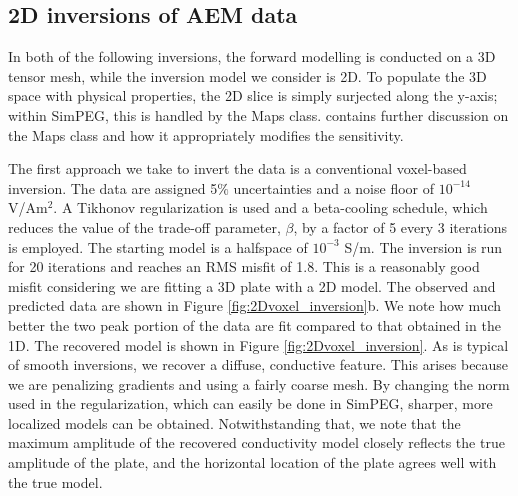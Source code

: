 \documentclass[paper]{geophysics}
\begin{document}
\subsection{2D inversions of AEM data}

In both of the following inversions, the forward modelling is conducted on a 3D tensor mesh, while the inversion model we consider is 2D. To populate the 3D space with physical properties, the 2D slice is simply surjected along the y-axis; within SimPEG, this is handled by the Maps class. \cite{kang2015c} contains further discussion on the Maps class and how it appropriately modifies the sensitivity.

The first approach we take to invert the data is a conventional voxel-based inversion. The data are assigned 5$\%$ uncertainties and a noise floor of $10^{-14}$ V/Am$^2$. A Tikhonov regularization is used and a beta-cooling schedule, which reduces the value of the trade-off parameter, $\beta$, by a factor of 5 every 3 iterations is employed. The starting model is a halfspace of $10^{-3}$ S/m. The inversion is run for 20 iterations and reaches an RMS misfit of 1.8. This is a reasonably good misfit considering we are fitting a 3D plate with a 2D model. The observed and predicted data are shown in Figure \ref{fig:2Dvoxel_inversion}b. We note how much better the two peak portion of the data are fit compared to that obtained in the 1D. The recovered model is shown in Figure \ref{fig:2Dvoxel_inversion}. As is typical of smooth inversions, we recover a diffuse, conductive feature. This arises because we are penalizing gradients and using a fairly coarse mesh. By changing the norm used in the regularization, which can easily be done in SimPEG, sharper, more localized models can be obtained. Notwithstanding that, we note that the maximum amplitude of the recovered conductivity model closely reflects the true amplitude of the plate, and the horizontal location of the plate agrees well with the true model.
\end{document}

